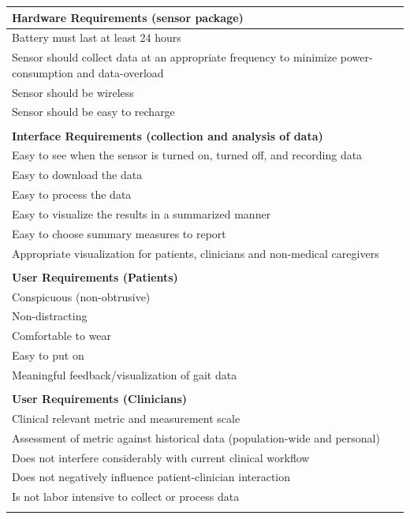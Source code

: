 \documentclass[11pt, oneside]{report}   	%
\begin{document}
\begin{table}

  \begin{tabular}{p{\textwidth}}

	\textbf{Hardware Requirements (sensor package)}    \\ \hline 
	Battery must last at least 24 hours \\ \hline
	Sensor should collect data at an appropriate frequency to minimize power-consumption and data-overload \\ \hline
	Sensor should be wireless \\ \hline
	Sensor should be easy to recharge \\ \\ 
	\textbf{Interface Requirements (collection and analysis of data)}    \\ \hline 
	Easy to see when the sensor is turned on, turned off, and recording data \\ \hline
	Easy to download the data \\ \hline
	Easy to process the data \\ \hline
	Easy to visualize the results in a summarized manner \\ \hline
	Easy to choose summary measures to report \\ \hline
	Appropriate visualization for patients, clinicians and non-medical caregivers \\ \\
	
	\textbf{User Requirements (Patients)} \\ \hline 
	Conspicuous (non-obtrusive) \\ \hline 
	Non-distracting \\ \hline 
	Comfortable to wear \\ \hline 
	Easy to put on \\ \hline 
	Meaningful feedback/visualization of gait data \\ \\
	
	\textbf{User Requirements (Clinicians)}  \\ \hline 
	Clinical relevant metric and measurement scale \\ \hline 
	Assessment of metric against historical data (population-wide and personal) \\ \hline 
	Does not interfere considerably with current clinical workflow \\ \hline 
	Does not negatively influence patient-clinician interaction \\ \hline 
	Is not labor intensive to collect or process data \\ \\
	

\end{tabular}
\end{table}
\end{document}

